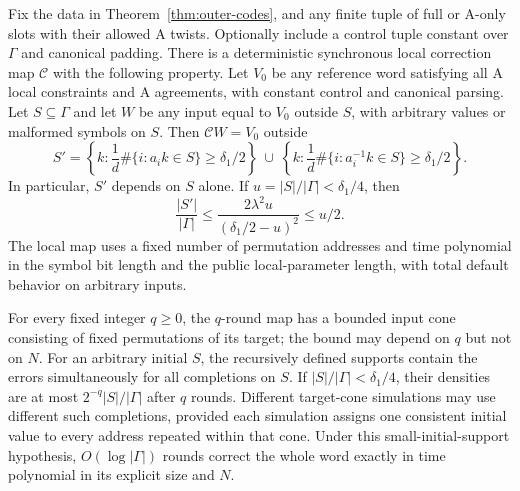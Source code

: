 \begin{lemma}\label{lem:outer-uncertainty}
Fix the data in Theorem~\ref{thm:outer-codes}, and any finite tuple of
full or A-only slots with their allowed A twists.  Optionally include
a control tuple constant over $\Gamma$ and canonical padding.
There is a deterministic synchronous local correction map $\mathcal C$
with the following property.  Let $V_0$ be any reference word satisfying
all A local constraints and A agreements, with constant control and
canonical parsing.  Let $S\subseteq\Gamma$ and let $W$ be any input
equal to $V_0$ outside $S$, with arbitrary values or malformed symbols
on $S$.  Then $\mathcal C W=V_0$ outside
\begin{equation}\label{oc:uncertainty-set}
 S'=
 \left\{k:\frac1d\#\{i:a_ik\in S\}\ge\delta_1/2\right\}
 \ \cup\
 \left\{k:\frac1d\#\{i:a_i^{-1}k\in S\}\ge\delta_1/2\right\}.
\end{equation}
In particular, $S'$ depends on $S$ alone.  If $u=|S|/|\Gamma|<\delta_1/4$,
then
\begin{equation}\label{oc:uncertainty-shrink}
 \frac{|S'|}{|\Gamma|}
 \le\frac{2\lambda^2u}{(\delta_1/2-u)^2}\le u/2.
\end{equation}
The local map uses a fixed number of permutation addresses and time
polynomial in the symbol bit length and the public local-parameter
length, with total default behavior on arbitrary inputs.

For every fixed integer $q\ge0$, the $q$-round map has a bounded
input cone consisting of fixed permutations of its target; the bound
may depend on $q$ but not on $N$.  For an arbitrary initial $S$, the
recursively defined supports contain the errors simultaneously for
all completions on $S$.  If $|S|/|\Gamma|<\delta_1/4$, their densities
are at most $2^{-q}|S|/|\Gamma|$ after $q$ rounds.  Different target-cone
simulations may use different such completions, provided each simulation
assigns one consistent initial value to every address repeated within
that cone.  Under this small-initial-support hypothesis,
$O(\log|\Gamma|)$ rounds correct the whole word exactly in time
polynomial in its explicit size and $N$.
\end{lemma}

